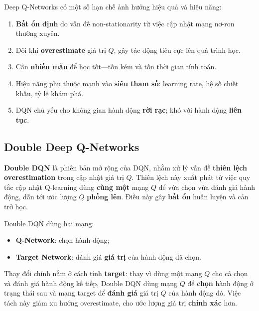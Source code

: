 \begin{luuy}[title={Các hạn chế chính}]
Deep Q-Networks có một số hạn chế ảnh hưởng hiệu quả và hiệu năng:
\begin{enumerate}
  \item \textbf{Bất ổn định} do vấn đề non-stationarity từ việc cập nhật mạng nơ-ron thường xuyên.
  \item Đôi khi \textbf{overestimate} giá trị $Q$, gây tác động tiêu cực lên quá trình học.
  \item Cần \textbf{nhiều mẫu} để học tốt---tốn kém và tốn thời gian tính toán.
  \item Hiệu năng phụ thuộc mạnh vào \textbf{siêu tham số}: learning rate, hệ số chiết khấu, tỷ lệ khám phá.
  \item DQN chủ yếu cho không gian hành động \textbf{rời rạc}; khó với hành động \textbf{liên tục}.
\end{enumerate}
\end{luuy}

\subsection{Double Deep Q-Networks}

\begin{dinhnghia}[title={Double DQN}]
\textbf{Double DQN} là phiên bản mở rộng của DQN, nhằm xử lý vấn đề \textbf{thiên lệch overestimation} trong cập nhật giá trị $Q$.
Thiên lệch này xuất phát từ việc quy tắc cập nhật Q-learning dùng \textbf{cùng một} mạng $Q$ để vừa chọn vừa đánh giá hành động, dẫn tới ước lượng $Q$ \textbf{phồng lên}.
Điều này gây \textbf{bất ổn} huấn luyện và cản trở học.
\end{dinhnghia}

\begin{phuongphap}[title={Hai mạng tách vai trò}]
Double DQN dùng hai mạng:
\begin{itemize}
  \item \textbf{Q-Network}: chọn hành động;
  \item \textbf{Target Network}: đánh giá \textbf{giá trị} của hành động đã chọn.
\end{itemize}
\end{phuongphap}

\begin{phuongphap}[title={Cách tính target}]
Thay đổi chính nằm ở cách tính \textbf{target}:
thay vì dùng một mạng $Q$ cho cả chọn và đánh giá hành động kế tiếp, Double DQN dùng mạng $Q$ để \textbf{chọn} hành động ở trạng thái sau và mạng target để \textbf{đánh giá} giá trị $Q$ của hành động đó.
Việc tách này giảm xu hướng overestimate, cho ước lượng giá trị \textbf{chính xác} hơn.
\end{phuongphap}

